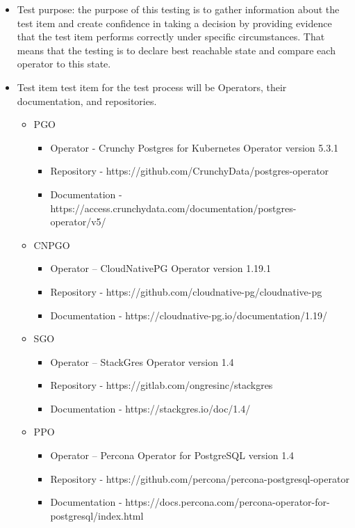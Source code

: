 \begin{itemize}
  \item Test purpose: the purpose of this testing is to gather information about the test item and create confidence in taking a decision by providing evidence that the test item performs correctly under specific circumstances. \cite{SoftwareTestingStandard3} That means that the testing is to declare best reachable state and compare each operator to this state.
  \item Test item test item for the test process will be Operators, their documentation, and repositories.
        \begin{itemize}
          \item PGO
                \begin{itemize}
                  \item	Operator - Crunchy Postgres for Kubernetes Operator version 5.3.1
                  \item	Repository -  https://github.com/CrunchyData/postgres-operator
                  \item	Documentation - https://access.crunchydata.com/documentation/postgres-operator/v5/
                \end{itemize}
          \item CNPGO
                \begin{itemize}
                  \item Operator – CloudNativePG Operator version 1.19.1
                  \item Repository -  https://github.com/cloudnative-pg/cloudnative-pg
                  \item Documentation - https://cloudnative-pg.io/documentation/1.19/
                \end{itemize}

          \item SGO
                \begin{itemize}
                  \item Operator – StackGres Operator version 1.4
                  \item Repository -  https://gitlab.com/ongresinc/stackgres
                  \item Documentation - https://stackgres.io/doc/1.4/
                \end{itemize}

          \item PPO
                \begin{itemize}
                  \item Operator – Percona Operator for PostgreSQL version 1.4
                  \item Repository -  https://github.com/percona/percona-postgresql-operator
                  \item Documentation - https://docs.percona.com/percona-operator-for-postgresql/index.html
                \end{itemize}
        \end{itemize}




\end{itemize}
